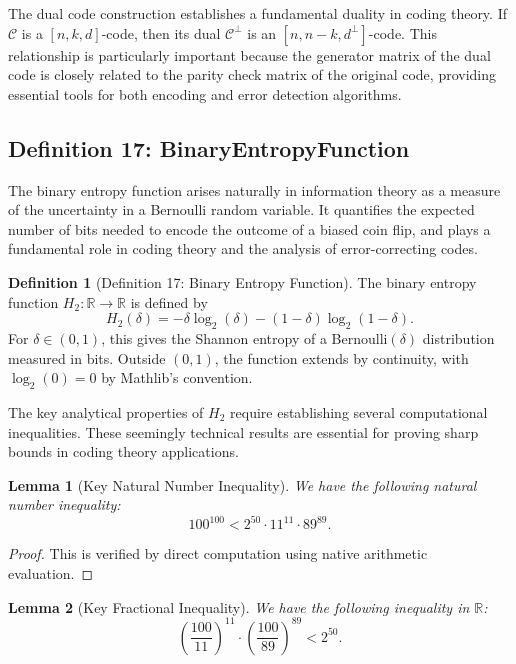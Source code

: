 \documentclass[11pt]{article}
\theoremstyle{plain}
\newtheorem*{lemma}{Lemma}
\theoremstyle{definition}
\newtheorem*{definition}{Definition}
\theoremstyle{remark}
\begin{document}
The dual code construction establishes a fundamental duality in coding theory. If $\mathcal{C}$ is a $[n,k,d]$-code, then its dual $\mathcal{C}^\perp$ is an $[n,n-k,d^\perp]$-code. This relationship is particularly important because the generator matrix of the dual code is closely related to the parity check matrix of the original code, providing essential tools for both encoding and error detection algorithms.

\vspace{1em}

\subsection{Definition 17: BinaryEntropyFunction}

The binary entropy function arises naturally in information theory as a measure of the uncertainty in a Bernoulli random variable. It quantifies the expected number of bits needed to encode the outcome of a biased coin flip, and plays a fundamental role in coding theory and the analysis of error-correcting codes.

\begin{definition}[Definition 17: Binary Entropy Function]
The binary entropy function $H_2 : \mathbb{R} \to \mathbb{R}$ is defined by
\[
H_2(\delta) = -\delta \log_2(\delta) - (1-\delta)\log_2(1-\delta).
\]
For $\delta \in (0,1)$, this gives the Shannon entropy of a Bernoulli$(\delta)$ distribution measured in bits. Outside $(0,1)$, the function extends by continuity, with $\log_2(0) = 0$ by Mathlib's convention.
\end{definition}

The key analytical properties of $H_2$ require establishing several computational inequalities. These seemingly technical results are essential for proving sharp bounds in coding theory applications.

\begin{lemma}[Key Natural Number Inequality]
We have the following natural number inequality:
\[
100^{100} < 2^{50} \cdot 11^{11} \cdot 89^{89}.
\]
\end{lemma}

\begin{proof}
This is verified by direct computation using native arithmetic evaluation.
\end{proof}

\begin{lemma}[Key Fractional Inequality]
We have the following inequality in $\mathbb{R}$:
\[
\left(\frac{100}{11}\right)^{11} \cdot \left(\frac{100}{89}\right)^{89} < 2^{50}.
\]
\end{lemma}
\end{document}
